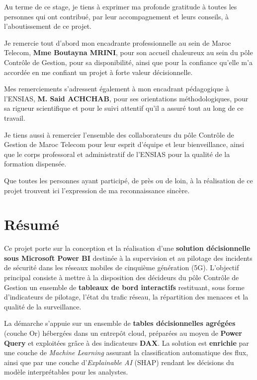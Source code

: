 \documentclass[12pt,a4paper,oneside]{report}
\begin{document}
Au terme de ce stage, je tiens à exprimer ma profonde gratitude à toutes les personnes qui ont contribué, par leur accompagnement et leurs conseils, à l'aboutissement de ce projet.

Je remercie tout d'abord mon encadrante professionnelle au sein de Maroc Telecom, \textbf{Mme Boutayna MRINI}, pour son accueil chaleureux au sein du pôle Contrôle de Gestion, pour sa disponibilité, ainsi que pour la confiance qu'elle m'a accordée en me confiant un projet à forte valeur décisionnelle.

Mes remerciements s'adressent également à mon encadrant pédagogique à l'ENSIAS, \textbf{M. Said ACHCHAB}, pour ses orientations méthodologiques, pour sa rigueur scientifique et pour le suivi attentif qu'il a assuré tout au long de ce travail.

Je tiens aussi à remercier l'ensemble des collaborateurs du pôle Contrôle de Gestion de Maroc Telecom pour leur esprit d'équipe et leur bienveillance, ainsi que le corps professoral et administratif de l'ENSIAS pour la qualité de la formation dispensée.

Que toutes les personnes ayant participé, de près ou de loin, à la réalisation de ce projet trouvent ici l'expression de ma reconnaissance sincère.

\chapter*{Résumé}

Ce projet porte sur la conception et la réalisation d'une \textbf{solution décisionnelle sous Microsoft Power BI} destinée à la supervision et au pilotage des incidents de sécurité dans les réseaux mobiles de cinquième génération (5G). L'objectif principal consiste à mettre à la disposition des décideurs du pôle Contrôle de Gestion un ensemble de \textbf{tableaux de bord interactifs} restituant, sous forme d'indicateurs de pilotage, l'état du trafic réseau, la répartition des menaces et la qualité de la surveillance.

La démarche s'appuie sur un ensemble de \textbf{tables décisionnelles agrégées} (couche Or) hébergées dans un entrepôt cloud, préparées au moyen de \textbf{Power Query} et exploitées grâce à des indicateurs \textbf{DAX}. La solution est \textbf{enrichie} par une couche de \emph{Machine Learning} assurant la classification automatique des flux, ainsi que par une couche d'\emph{Explainable AI} (SHAP) rendant les décisions du modèle interprétables pour les analystes.
\end{document}
